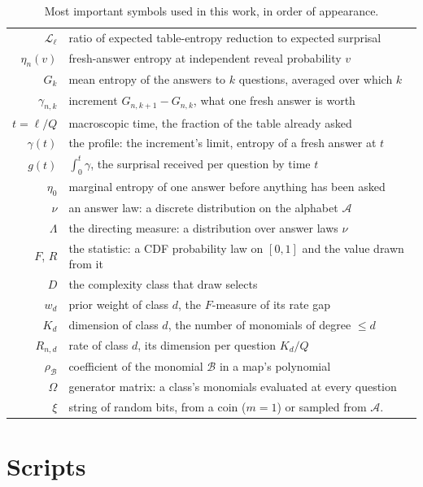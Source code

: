 \documentclass[11pt]{article}
\let\stdsection\section
\renewcommand{\section}{\clearpage\stdsection}
\begin{document}
\begin{table}[H]
\begin{center}
\begin{tabular}{@{}r@{\qquad}l@{}}
$\mathcal L_\ell$ & ratio of expected table-entropy reduction to expected surprisal \\
$\eta_n(v)$ & fresh-answer entropy at independent reveal probability $v$ \\
$G_k$ & mean entropy of the answers to $k$ questions, averaged over which $k$ \\
$\gamma_{n,k}$ & increment $G_{n,k+1} - G_{n,k}$, what one fresh answer is worth \\
\addlinespace[5pt]
$t = \ell/Q$ & macroscopic time, the fraction of the table already asked \\
$\gamma(t)$ & the profile: the increment's limit, entropy of a fresh answer at $t$ \\
$g(t)$ & $\int_0^t\gamma$, the surprisal received per question by time $t$ \\
$\eta_0$ & marginal entropy of one answer before anything has been asked \\
$\nu$ & an answer law: a discrete distribution on the alphabet $\mathcal A$ \\
$\Lambda$ & the directing measure: a distribution over answer laws $\nu$ \\
\addlinespace[5pt]
$F$, $R$ & the statistic: a CDF probability law on $[0,1]$ and the value drawn from it \\
$D$ & the complexity class that draw selects \\
$w_d$ & prior weight of class $d$, the $F$-measure of its rate gap \\
$K_d$ & dimension of class $d$, the number of monomials of degree $\le d$ \\
$R_{n,d}$ & rate of class $d$, its dimension per question $K_d/Q$ \\
$\rho_{\mathcal B}$ & coefficient of the monomial $\mathcal B$ in a map's polynomial \\
$\Omega$ & generator matrix: a class's monomials evaluated at every question \\
$\xi$ & string of random bits, from a coin ($m=1$) or sampled from $\mathcal A$. \\
\bottomrule
\end{tabular}
\end{center}
\caption{Most important symbols used in this work, in order of appearance.}
\label{tab:symbols}
\end{table}

\section{Scripts}\label{app:scripts}
\end{document}
